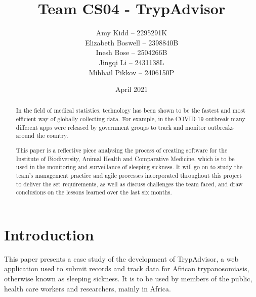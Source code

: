 \documentclass{l3proj}
\begin{document}
\title{Team CS04 - TrypAdvisor}

\author{Amy Kidd -- 2295291K\\
        Elizabeth Boswell -- 2398840B\\
        Inesh Bose -- 2504266B\\
        Jingqi Li -- 2431138L\\
        Mihhail Pikkov -- 2406150P}

\date{April 2021}

\maketitle

\begin{abstract}
\normalsize In the field of medical statistics, technology has been shown to be the fastest and most efficient way of globally collecting data. For example, in the COVID-19 outbreak many different apps were released by government groups to track and monitor outbreaks around the country.

This paper is a reflective piece analysing the process of creating software for the Institute of Biodiversity, Animal Health and Comparative Medicine, which is to be used in the monitoring and surveillance of sleeping sickness. It will go on to study the team's management practice and agile processes incorporated throughout this project to deliver the set requirements, as well as discuss challenges the team faced, and draw conclusions on the lessons learned over the last six months.
\end{abstract}

\educationalconsent


\newpage

\section{Introduction}
This paper presents a case study of the development of TrypAdvisor, a web application used to submit records and track data for African trypanosomiasis, otherwise known as sleeping sickness. It is to be used by members of the public, health care workers and researchers, mainly in Africa.
\end{document}
